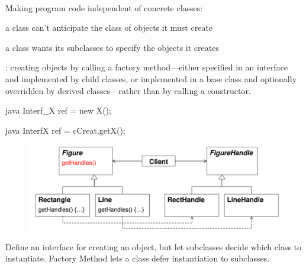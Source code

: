 \begin{figure}[H]	
  \centering
    \resizebox{\linewidth}{!}{\tikzset{font=\Huge}}
\end{figure}
\begin{intentbox}[Intent]\\
  \begin{itemizenosep}
    \item
    Making program code independent of concrete classes:
    \item 
    a class can't anticipate the class of objects it must create
    \item
    a class wants its subclasses to specify the objects it creates
\end{itemizenosep}
: creating objects by calling a factory method—either specified in an interface and implemented by child classes, or implemented in a base class and optionally overridden by derived classes—rather than by calling a constructor.
\end{intentbox}
{\centering
\begin{minipage}[t]{0.5\columnwidth}
  \begin{codeboxNl}{java}
        Interf_X ref = new X();
  \end{codeboxNl}
\end{minipage}
\begin{minipage}[t]{0.45\columnwidth}
  \begin{codeboxNl}[factoryMethod]{java}
        InterfX ref = cCreat.getX();
  \end{codeboxNl}
\end{minipage}}
\begin{figure}[H]
  \centering
  \includegraphics[width=1.0\columnwidth]{figures/factoryMethodHandles.png}
  \caption{}
  \label{fig:}
\end{figure}
\begin{defnbox}\nospacing
  \begin{defn}\label{defn:}
    Define an interface for creating an object, but let subclasses decide which class to instantiate. Factory Method lets a class defer instantiation to subclasses. 
  \end{defn}
\end{defnbox}
